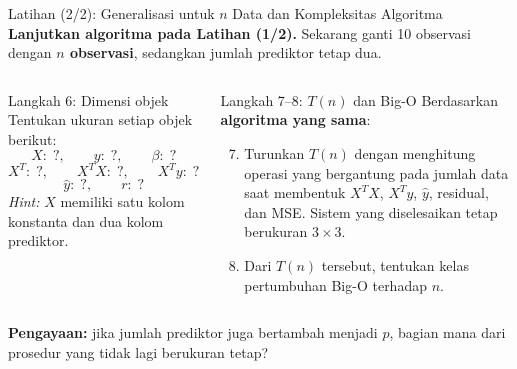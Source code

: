 \documentclass[aspectratio=169,11pt]{beamer}
\begin{document}
\begin{frame}{Latihan (2/2): Generalisasi untuk $n$ Data dan Kompleksitas Algoritma}
\small
\textbf{Lanjutkan algoritma pada Latihan (1/2).} Sekarang ganti 10 observasi dengan \textbf{$n$ observasi}, sedangkan jumlah prediktor tetap dua.
\begin{columns}[T]
\begin{block}{Langkah 6: Dimensi objek}
Tentukan ukuran setiap objek berikut:
\[
X:\; ? ,\qquad y:\; ? ,\qquad \beta:\; ?
\]
\[
X^T:\; ? ,\qquad X^TX:\; ? ,\qquad X^Ty:\; ?
\]
\[
\hat y:\; ? ,\qquad r:\; ?
\]
\textit{Hint:} $X$ memiliki satu kolom konstanta dan dua kolom prediktor.
\end{block}
\begin{block}{Langkah 7--8: $T(n)$ dan Big-O}
Berdasarkan \textbf{algoritma yang sama}:
\begin{enumerate}
  \setcounter{enumi}{6}
  \item Turunkan $T(n)$ dengan menghitung operasi yang bergantung pada jumlah data saat membentuk $X^TX$, $X^Ty$, $\hat y$, residual, dan MSE. Sistem yang diselesaikan tetap berukuran $3\times3$.
  \item Dari $T(n)$ tersebut, tentukan kelas pertumbuhan Big-O terhadap $n$.
\end{enumerate}
\end{block}
\end{columns}
\vspace{1mm}
{\footnotesize \textbf{Pengayaan:} jika jumlah prediktor juga bertambah menjadi $p$, bagian mana dari prosedur yang tidak lagi berukuran tetap?}
\end{frame}
\end{document}
